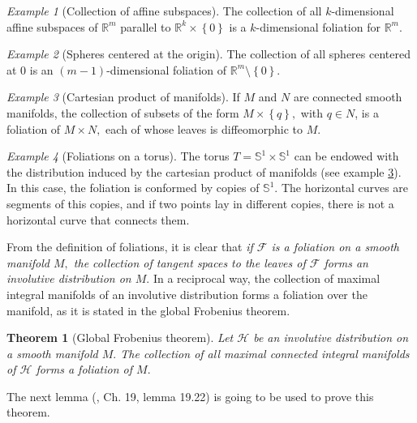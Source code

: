 \documentclass[12pt, letterpaper, reqno]{amsart}
\theoremstyle{definition}
\theoremstyle{plain}
\newtheorem{thm}{Theorem}
\theoremstyle{remark}
\newtheorem{ex}{Example}
\begin{document}
\begin{ex}[Collection of affine subspaces]
	The collection of all $ k $-dimensional affine subspaces of $ \mathbb{R}^m $ parallel to $ \mathbb{R}^k\times \left\{ 0 \right\} $ is a $ k $-dimensional foliation for $ \mathbb{R}^m. $ 
\end{ex}

\begin{ex}[Spheres centered at the origin]
	The collection of all spheres centered at $ 0 $ is an $ (m-1) $-dimensional foliation of $ \mathbb{R}^m\setminus \left\{ 0 \right\} $. 
\end{ex}

\begin{ex}[Cartesian product of manifolds]\label{ex:product_foliation}
	If $ M $ and $ N $ are connected smooth manifolds, the collection of subsets of the form $ M\times \left\{ q \right\}, $ with $ q\in N $, is a foliation of $ M\times N, $ each of whose leaves is diffeomorphic to $ M. $  	
\end{ex}

\begin{ex}[Foliations on a torus]
	The torus $ T= \mathbb{S}^1\times \mathbb{S}^1 $ can be endowed with the distribution induced by the cartesian product of manifolds (see example \ref{ex:product_foliation}). In this case, the foliation is conformed by copies of $ \mathbb{S}^1. $ The horizontal curves are segments of this copies, and if two points lay in different copies, there is not a horizontal curve that connects them.
\end{ex}

From the definition of foliations, it is clear that \textit{if $ \mathcal{F} $ is a foliation on a smooth manifold $ M, $ the collection of tangent spaces to the leaves of $ \mathcal{F} $ forms an involutive distribution on $ M. $} In a reciprocal way, the collection of maximal integral manifolds of an involutive distribution forms a foliation over the manifold, as it is stated in the global Frobenius theorem.

\begin{thm}[Global Frobenius theorem]
	Let $ \mathcal{H} $ be an involutive distribution on a smooth manifold $ M. $ The collection of all maximal connected integral manifolds of $ \mathcal{H} $ forms a foliation of $ M. $ 
\end{thm}

The next lemma (\cite{lee2003introduction}, Ch. 19, lemma 19.22) is going to be used to prove this theorem.
\end{document}
